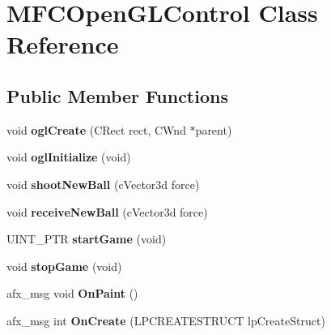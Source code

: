 \hypertarget{classMFCOpenGLControl}{
\section{MFCOpenGLControl Class Reference}
\label{classMFCOpenGLControl}
}
\subsection*{Public Member Functions}
\begin{DoxyCompactItemize}
\item 
\hypertarget{classMFCOpenGLControl_a3342c46d98d5f24ef1a7c7eb29ffac9f}{
void {\bfseries oglCreate} (CRect rect, CWnd $\ast$parent)}
\label{classMFCOpenGLControl_a3342c46d98d5f24ef1a7c7eb29ffac9f}

\item 
\hypertarget{classMFCOpenGLControl_a6b8a3076ae04e9872606834e90ed1e49}{
void {\bfseries oglInitialize} (void)}
\label{classMFCOpenGLControl_a6b8a3076ae04e9872606834e90ed1e49}

\item 
\hypertarget{classMFCOpenGLControl_a4055c7ec917559db7ca7a62e9ce8a7a5}{
void {\bfseries shootNewBall} (cVector3d force)}
\label{classMFCOpenGLControl_a4055c7ec917559db7ca7a62e9ce8a7a5}

\item 
\hypertarget{classMFCOpenGLControl_aa103d25f2c4867a8bf9aec0c8d4f5a08}{
void {\bfseries receiveNewBall} (cVector3d force)}
\label{classMFCOpenGLControl_aa103d25f2c4867a8bf9aec0c8d4f5a08}

\item 
\hypertarget{classMFCOpenGLControl_aaee89af6d47184edaaebda0b6d24b50e}{
UINT\_\-PTR {\bfseries startGame} (void)}
\label{classMFCOpenGLControl_aaee89af6d47184edaaebda0b6d24b50e}

\item 
\hypertarget{classMFCOpenGLControl_a01c6a55bcfbfa06d720c59c75dff33b9}{
void {\bfseries stopGame} (void)}
\label{classMFCOpenGLControl_a01c6a55bcfbfa06d720c59c75dff33b9}

\item 
\hypertarget{classMFCOpenGLControl_a297305ddb3f2572a991094ef4e1fff68}{
afx\_\-msg void {\bfseries OnPaint} ()}
\label{classMFCOpenGLControl_a297305ddb3f2572a991094ef4e1fff68}

\item 
\hypertarget{classMFCOpenGLControl_a989f49efb8a557c4d1b3b2f180dbdbdc}{
afx\_\-msg int {\bfseries OnCreate} (LPCREATESTRUCT lpCreateStruct)}
\label{classMFCOpenGLControl_a989f49efb8a557c4d1b3b2f180dbdbdc}


\end{DoxyCompactItemize}
